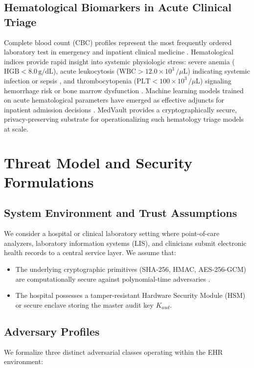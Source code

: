 \documentclass[conference]{IEEEtran}
\begin{document}
\subsection{Hematological Biomarkers in Acute Clinical Triage}
Complete blood count (CBC) profiles represent the most frequently ordered laboratory test in emergency and inpatient clinical medicine \cite{britton2016complete, shaffer2021clinical}. Hematological indices provide rapid insight into systemic physiologic stress: severe anemia ($\text{HGB} < 8.0\,\text{g/dL}$), acute leukocytosis ($\text{WBC} > 12.0\times 10^3\,/\mu\text{L}$) indicating systemic infection or sepsis \cite{alpert2020leukocytosis}, and thrombocytopenia ($\text{PLT} < 100\times 10^3\,/\mu\text{L}$) signaling hemorrhage risk or bone marrow dysfunction \cite{george2019platelets}. Machine learning models trained on acute hematological parameters have emerged as effective adjuncts for inpatient admission decisions \cite{bates2014big, goldstein2017opportunities, sharma2023benchmarking}. MedVault provides a cryptographically secure, privacy-preserving substrate for operationalizing such hematology triage models at scale.

\section{Threat Model and Security Formulations}
\label{sec:threat}

\subsection{System Environment and Trust Assumptions}
We consider a hospital or clinical laboratory setting where point-of-care analyzers, laboratory information systems (LIS), and clinicians submit electronic health records to a central service layer. We assume that:
\begin{itemize}
    \item The underlying cryptographic primitives (SHA-256, HMAC, AES-256-GCM) are computationally secure against polynomial-time adversaries \cite{bellare1993random}.
    \item The hospital possesses a tamper-resistant Hardware Security Module (HSM) or secure enclave storing the master audit key $K_{aud}$.
\end{itemize}

\subsection{Adversary Profiles}
We formalize three distinct adversarial classes operating within the EHR environment:
\end{document}
